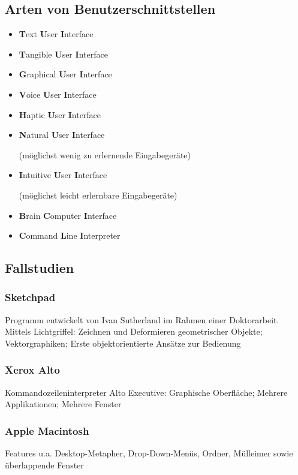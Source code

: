 \documentclass[8pt,a4paper,landscape]{extarticle}
\begin{document}
\begin{multicols*}{4}
	\subsection{Arten von Benutzerschnittstellen}
	\begin{itemize}
		\item \textbf{T}ext \textbf{U}ser \textbf{I}nterface
		\item \textbf{T}angible \textbf{U}ser \textbf{I}nterface
		\item \textbf{G}raphical \textbf{U}ser \textbf{I}nterface
		\item \textbf{V}oice \textbf{U}ser \textbf{I}nterface
		\item \textbf{H}aptic \textbf{U}ser \textbf{I}nterface
		\item \textbf{N}atural \textbf{U}ser \textbf{I}nterface\par
		      (möglichst wenig zu erlernende Eingabegeräte)
		\item \textbf{I}ntuitive \textbf{U}ser \textbf{I}nterface\par
		      (möglichst leicht erlernbare Eingabegeräte)
		\item \textbf{B}rain \textbf{C}omputer \textbf{I}nterface
		\item \textbf{C}ommand \textbf{L}ine \textbf{I}nterpreter
	\end{itemize}
	\subsection{Fallstudien}
	\subsubsection*{Sketchpad}
	Programm entwickelt von Ivan Sutherland im Rahmen einer Doktorarbeit. \\
	Mittels Lichtgriffel: Zeichnen und Deformieren geometrischer Objekte;
	Vektorgraphiken; Erste objektorientierte Ansätze zur Bedienung
	\subsubsection*{Xerox Alto}
	Kommandozeileninterpreter Alto Executive: Graphische Oberfläche;
	Mehrere Applikationen; Mehrere Fenster
	\subsubsection*{Apple Macintosh}
	Features u.a. Desktop-Metapher, Drop-Down-Menüs, Ordner, Mülleimer sowie
	überlappende Fenster

\end{multicols*}
\end{document}
